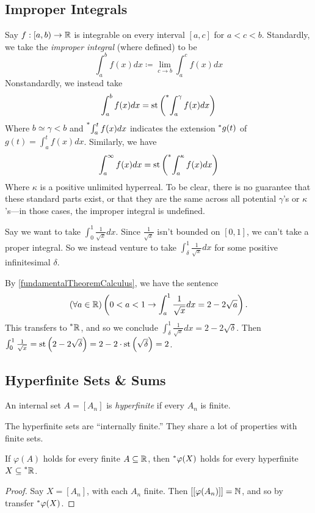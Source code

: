 \subsection{Improper Integrals}
Say $f: [a, b) \to \mathbb{R}$ is integrable on every interval $[a, c]$ for $a < c < b$. Standardly, we take the \textit{improper integral} (where defined) to be
\[\int_a^b f(x)dx \coloneq \lim_{c \to b} \int_a^c f(x)dx\]
Nonstandardly, we instead take
\[\int_a^b f(x)dx = \operatorname{st}\left(\prescript{*}{}{\int_a^\gamma f(x)dx}\right)\]
Where $b \simeq \gamma < b$ and $\prescript{*}{}{\int_a^t f(x)dx}$ indicates the extension $\prescript{*}{}{g}(t)$ of $g(t) = \int_a^t f(x)dx$. Similarly, we have
\[\int_a^\infty f(x)dx = \operatorname{st}\left(\prescript{*}{}{\int_a^\kappa f(x)dx}\right)\]
Where $\kappa$ is a positive unlimited hyperreal. To be clear, there is no guarantee that these standard parts exist, or that they are the same across all potential $\gamma$'s or $\kappa$'s---in those cases, the improper integral is undefined.

Say we want to take $\int_0^1 \frac{1}{\sqrt{x}} dx$. Since $\frac{1}{\sqrt{x}}$ isn't bounded on $[0, 1]$, we can't take a proper integral. So we instead venture to take $\int_\delta^1 \frac{1}{\sqrt{x}} dx$ for some positive infinitesimal $\delta$. 

By \ref{fundamentalTheoremCalculus}, we have the sentence
\[
(\forall a \in \mathbb{R})\left(0 < a < 1 \to \int_a^1 \frac{1}{\sqrt{x}} dx= 2 - 2 \sqrt{a}\right).
\]
This transfers to $\prescript{*}{}{\mathbb{R}}$, and so we conclude $\int_\delta^1 \frac{1}{\sqrt{x}} dx = 2 - 2\sqrt{\delta}$. Then $\int_0^1 \frac{1}{\sqrt{x}} = \operatorname{st}\left(2 - 2 \sqrt{\delta}\right) = 2 - 2 \cdot \operatorname{st}\left(\sqrt{\delta}\right) = 2$.  

\subsection{Hyperfinite Sets \& Sums}
\begin{defn}
    An internal set $A = [A_n]$ is \textit{hyperfinite} if every $A_n$ is finite.
\end{defn}

The hyperfinite sets are ``internally finite.'' They share a lot of properties with finite sets.

\begin{thm}\label{HyperfiniteTransfer}
    If $\varphi(A)$ holds for every finite $A \subseteq \mathbb{R}$, then $\prescript{*}{}{\varphi}(X)$ holds for every hyperfinite $X \subseteq \prescript{*}{}{\mathbb{R}}$.
\end{thm}

\begin{proof}
    Say $X = [A_n]$, with each $A_n$ finite. Then $[[\varphi(A_n)]] = \mathbb{N}$, and so by transfer $\prescript{*}{}{\varphi}(X)$.
\end{proof}

